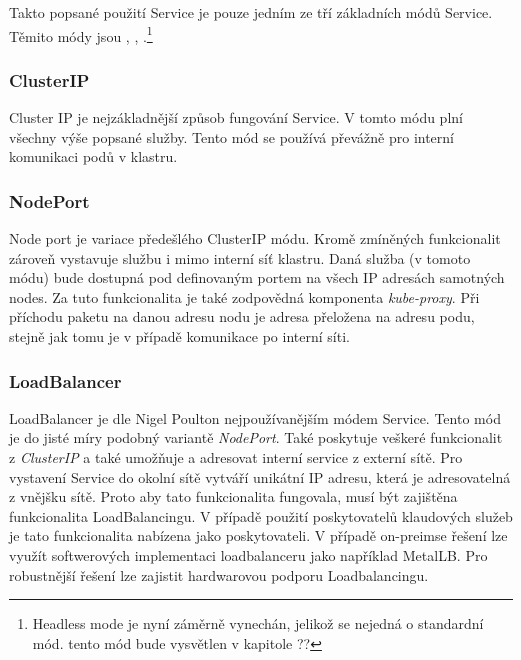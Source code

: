 Takto popsané použití Service je pouze jedním ze tří základních módů Service. Těmito módy jsou , , .\footnote{Headless mode je nyní záměrně vynechán, jelikož se nejedná o standardní mód. tento mód bude vysvětlen v kapitole ??} 

\subsubsection{ClusterIP}
Cluster IP je nejzákladnější způsob fungování Service. V tomto módu plní všechny výše popsané služby. Tento mód se používá převážně pro interní komunikaci podů v klastru. 
\subsubsection{NodePort}
Node port je variace předešlého ClusterIP módu. Kromě zmíněných funkcionalit zároveň vystavuje službu i mimo interní síť klastru. Daná služba (v tomoto módu) bude dostupná pod definovaným portem na všech IP adresách samotných nodes. Za tuto funkcionalita je také zodpovědná komponenta \textit{kube-proxy}. Při příchodu paketu na danou adresu nodu je adresa přeložena na adresu podu, stejně jak tomu je v případě komunikace po interní síti.   
\subsubsection{LoadBalancer}
LoadBalancer je dle Nigel Poulton\cite{poulton_2022_the} nejpoužívanějším módem Service. Tento mód je do jisté míry podobný variantě \textit{NodePort}. Také poskytuje veškeré funkcionalit z \textit{ClusterIP} a také umožňuje a adresovat interní service z externí sítě. Pro vystavení Service do okolní sítě vytváří unikátní IP adresu, která je adresovatelná z vnějšku sítě. Proto aby tato funkcionalita fungovala, musí být zajištěna funkcionalita LoadBalancingu. V případě použití poskytovatelů klaudových služeb je tato funkcionalita nabízena jako poskytovateli. V případě on-preimse řešení lze využít softwerových implementaci loadbalanceru jako například MetalLB. Pro robustnější řešení lze zajistit hardwarovou podporu Loadbalancingu. 


